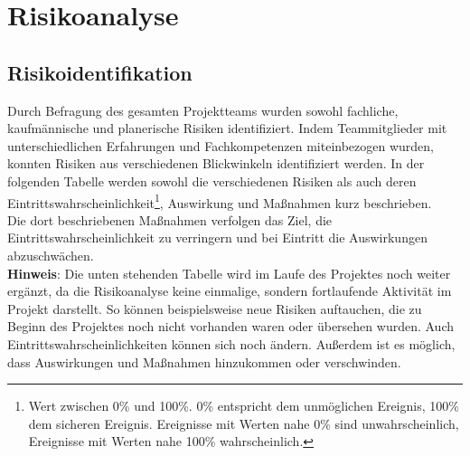 \documentclass[../review_1.tex]{subfiles}
\begin{document}
\chapter{Risikoanalyse}\thispagestyle{fancy}
\section{Risikoidentifikation}
Durch Befragung des gesamten Projektteams wurden sowohl fachliche, kaufmännische und planerische Risiken identifiziert. Indem Teammitglieder mit unterschiedlichen Erfahrungen und Fachkompetenzen miteinbezogen wurden, konnten Risiken aus verschiedenen Blickwinkeln identifiziert werden. In der folgenden Tabelle werden sowohl die verschiedenen Risiken als auch deren Eintrittswahrscheinlichkeit\footnote{Wert zwischen 0\% und 100\%. 0\% entspricht dem unmöglichen Ereignis, 100\% dem sicheren Ereignis. Ereignisse mit Werten nahe 0\% sind unwahrscheinlich, Ereignisse mit Werten nahe 100\% wahrscheinlich.}, Auswirkung und Maßnahmen kurz beschrieben.\\ Die dort beschriebenen Maßnahmen verfolgen das Ziel, die Eintrittswahrscheinlichkeit zu verringern und bei Eintritt die Auswirkungen abzuschwächen.\\
\textbf{Hinweis}: Die unten stehenden Tabelle wird im Laufe des Projektes noch weiter ergänzt, da die Risikoanalyse keine einmalige, sondern fortlaufende Aktivität im Projekt darstellt. So können beispielsweise neue Risiken auftauchen, die zu Beginn des Projektes noch nicht vorhanden waren oder übersehen wurden. Auch Eintrittswahrscheinlichkeiten können sich noch ändern. Außerdem ist es möglich, dass Auswirkungen und Maßnahmen hinzukommen oder verschwinden.
\end{document}
